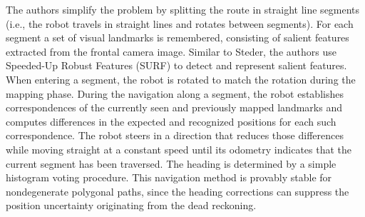 The authors simplify the problem by splitting the route in straight line segments (i.e., the robot travels in straight lines and rotates between segments).
For each segment a set of visual landmarks is remembered, consisting of salient features extracted from the frontal camera image.
Similar to Steder, the authors use Speeded-Up Robust Features (SURF) to detect and represent salient features.
When entering a segment, the robot is rotated to match the rotation during the mapping phase.
During the navigation along a segment, the robot establishes correspondences of the currently seen and previously mapped landmarks and computes differences in the expected and recognized positions for each such correspondence.
The robot steers in a direction that reduces those differences while moving straight at a constant speed until its odometry indicates that the current segment has been traversed.
The heading is determined by a simple histogram voting procedure.
This navigation method is provably stable for nondegenerate polygonal paths, since the heading corrections can suppress the position uncertainty originating from the dead reckoning.
